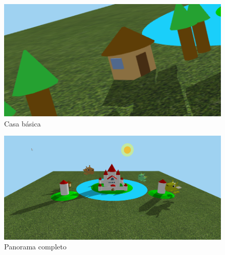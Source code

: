 \documentclass[11pt]{article}
\begin{document}
\begin{figure}[H]
    \centering    
    \includegraphics[scale=0.7]{img/casa.PNG}
    \caption{Casa básica}
\end{figure}

\begin{figure}[H]
    \centering    
    \includegraphics[scale=0.42]{img/full.png}
    \caption{Panorama completo}
\end{figure}
\end{document}
